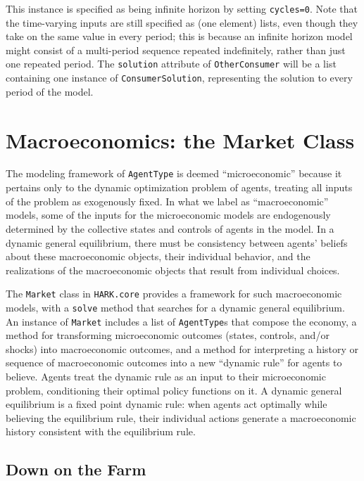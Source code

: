 \documentclass[12pt,titlepage,letterpaper]{econtex}
\begin{document}
{\vspace{0.25cm}

This instance is specified as being infinite horizon by setting \texttt{cycles=0}.  Note that the time-varying inputs are still specified as (one element) lists, even though they take on the same value in every period; this is because an infinite horizon model might consist of a multi-period sequence repeated indefinitely, rather than just one repeated period.  The \texttt{solution} attribute of \texttt{OtherConsumer} will be a list containing one instance of \texttt{ConsumerSolution}, representing the solution to every period of the model.

\section{Macroeconomics: the Market Class}\label{sec:Macroeconomics}

The modeling framework of \texttt{AgentType} is deemed ``microeconomic'' because it pertains only to the dynamic optimization problem of agents, treating all inputs of the problem as exogenously fixed.  In what we label as ``macroeconomic'' models, some of the inputs for the microeconomic models are endogenously determined by the collective states and controls of agents in the model.  In a dynamic general equilibrium, there must be consistency between agents' beliefs about these macroeconomic objects, their individual behavior, and the realizations of the macroeconomic objects that result from individual choices.

The \texttt{Market} class in \texttt{HARK.core} provides a framework for such macroeconomic models, with a \texttt{solve} method that searches for a dynamic general equilibrium.  An instance of \texttt{Market} includes a list of \texttt{AgentType}s that compose the economy, a method for transforming microeconomic outcomes (states, controls, and/or shocks) into macroeconomic outcomes, and a method for interpreting a history or sequence of macroeconomic outcomes into a new ``dynamic rule'' for agents to believe.  Agents treat the dynamic rule as an input to their microeconomic problem, conditioning their optimal policy functions on it.  A dynamic general equilibrium is a fixed point dynamic rule: when agents act optimally while believing the equilibrium rule, their individual actions generate a macroeconomic history consistent with the equilibrium rule.

\subsection{Down on the Farm}\label{sec:DownOnTheFarm}

}
\end{document}
